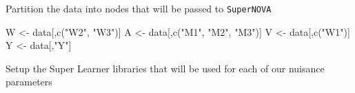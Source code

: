 \documentclass[
]{article}
\newenvironment{Shaded}{\begin{snugshade}}{\end{snugshade}}
\newcommand{\FunctionTok}[1]{\textcolor[rgb]{0.00,0.00,0.00}{#1}}
\newcommand{\NormalTok}[1]{#1}
\newcommand{\OtherTok}[1]{\textcolor[rgb]{0.56,0.35,0.01}{#1}}
\newcommand{\SpecialCharTok}[1]{\textcolor[rgb]{0.00,0.00,0.00}{#1}}
\newcommand{\StringTok}[1]{\textcolor[rgb]{0.31,0.60,0.02}{#1}}
\begin{document}
\begin{Shaded}
\end{Shaded}

Partition the data into nodes that will be passed to \texttt{SuperNOVA}

\begin{Shaded}
\begin{Highlighting}[]

\NormalTok{W }\OtherTok{\textless{}{-}}\NormalTok{ data[,}\FunctionTok{c}\NormalTok{(}\StringTok{"W2"}\NormalTok{, }\StringTok{"W3"}\NormalTok{)]}
\NormalTok{A }\OtherTok{\textless{}{-}}\NormalTok{ data[,}\FunctionTok{c}\NormalTok{(}\StringTok{"M1"}\NormalTok{, }\StringTok{"M2"}\NormalTok{, }\StringTok{"M3"}\NormalTok{)]}
\NormalTok{V }\OtherTok{\textless{}{-}}\NormalTok{ data[,}\FunctionTok{c}\NormalTok{(}\StringTok{"W1"}\NormalTok{)]}
\NormalTok{Y }\OtherTok{\textless{}{-}}\NormalTok{ data[,}\StringTok{"Y"}\NormalTok{]}
\end{Highlighting}
\end{Shaded}

Setup the Super Learner libraries that will be used for each of our
nuisance parameters
\end{document}
